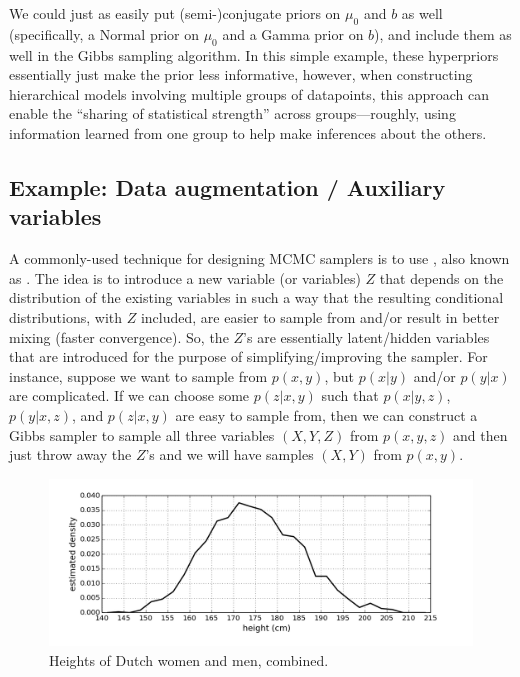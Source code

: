 \documentclass[12pt]{article}
\begin{document}
We could just as easily put (semi-)conjugate priors on $\mu_0$ and $b$ as well (specifically, a Normal prior on $\mu_0$ and a Gamma prior on
$b$), and include them as well in the Gibbs sampling algorithm.  In this simple example, these hyperpriors essentially just make the prior
less informative, however, when constructing hierarchical models involving multiple groups of datapoints, this approach can enable the
``sharing of statistical strength'' across groups---roughly, using information learned from one group to help make inferences about the
others.  




\subsection{Example: Data augmentation / Auxiliary variables}

A commonly-used technique for designing MCMC samplers is to use , also known as .
The idea is to introduce a new variable (or variables) $Z$ that depends on the distribution of the existing variables in such a way that the
resulting conditional distributions, with $Z$ included, are easier to sample from and/or result in better mixing (faster convergence). 
So, the $Z$'s are essentially latent/hidden variables that are introduced for the purpose of simplifying/improving the sampler.
For instance, suppose we want to sample from $p(x,y)$, but $p(x|y)$ and/or $p(y|x)$ are complicated.  If we can choose some $p(z|x,y)$ such
that $p(x|y,z)$, $p(y|x,z)$, and $p(z|x,y)$ are easy to sample from, then we can construct a Gibbs sampler to sample all three variables
$(X,Y,Z)$ from $p(x,y,z)$ and then just throw away the $Z$'s and we will have samples $(X,Y)$ from $p(x,y)$.

\begin{figure}
  \begin{center}
    \includegraphics[width=1\textwidth]{heights-combined.png}
  \end{center}
  \caption{Heights of Dutch women and men, combined.}
  \label{figure:heights-combined}
\end{figure}
\end{document}
